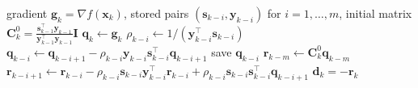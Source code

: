 \begin{algorithm}[ht]
  \caption{L-BFGS via forward and backward passes}
  \label{alg:ch6-lbfgs}
  \begin{algorithmic}
    \REQUIRE gradient $\mathbf{g}_k=\nabla f(\mathbf{x}_k)$, stored pairs
    $(\mathbf{s}_{k-i},\mathbf{y}_{k-i})$ for $i=1,\dots,m$, initial matrix
    $\mathbf{C}_k^0=
    \frac{\mathbf{s}_{k-1}^\top \mathbf{y}_{k-1}}
    {\mathbf{y}_{k-1}^\top \mathbf{y}_{k-1}}\mathbf{I}$
    \STATE $\mathbf{q}_k\gets \mathbf{g}_k$
      \STATE $\rho_{k-i}\gets 1/(\mathbf{y}_{k-i}^\top \mathbf{s}_{k-i})$
      \STATE $\mathbf{q}_{k-i}\gets
      \mathbf{q}_{k-i+1}
      -\rho_{k-i}\mathbf{y}_{k-i}\mathbf{s}_{k-i}^\top \mathbf{q}_{k-i+1}$
      \STATE save $\mathbf{q}_{k-i}$
    \ENDFOR
    \STATE $\mathbf{r}_{k-m}\gets \mathbf{C}_k^0 \mathbf{q}_{k-m}$
      \STATE $\mathbf{r}_{k-i+1}\gets
      \mathbf{r}_{k-i}
      -\rho_{k-i}\mathbf{s}_{k-i}\mathbf{y}_{k-i}^\top \mathbf{r}_{k-i}
      +\rho_{k-i}\mathbf{s}_{k-i}\mathbf{s}_{k-i}^\top \mathbf{q}_{k-i+1}$
    \ENDFOR
    \RETURN $\mathbf{d}_k=-\mathbf{r}_k$
  \end{algorithmic}
\end{algorithm}
